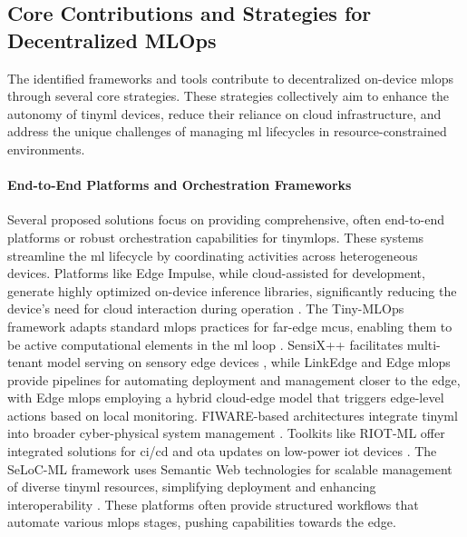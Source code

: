 \subsection{Core Contributions and Strategies for Decentralized MLOps}
\label{ssec:core_contributions_strategies_rq2}

The identified frameworks and tools contribute to decentralized on-device \gls{mlops} through several core strategies. These strategies collectively aim to enhance the autonomy of \gls{tinyml} devices, reduce their reliance on cloud infrastructure, and address the unique challenges of managing \gls{ml} lifecycles in resource-constrained environments.

\paragraph{End-to-End Platforms and Orchestration Frameworks}
Several proposed solutions focus on providing comprehensive, often end-to-end platforms or robust orchestration capabilities for \gls{tinymlops}. These systems streamline the \gls{ml} lifecycle by coordinating activities across heterogeneous devices. Platforms like Edge Impulse, while cloud-assisted for development, generate highly optimized on-device inference libraries, significantly reducing the device's need for cloud interaction during operation \cite{banburyEdgeImpulseMLOps2023}. The Tiny-MLOps framework adapts standard \gls{mlops} practices for far-edge \glspl{mcu}, enabling them to be active computational elements in the \gls{ml} loop \cite{antoniniTinyMLOpsFrameworkOrchestrating2022}. SensiX++ facilitates multi-tenant model serving on sensory edge devices \cite{minSensiXBringingMLOps2023}, while LinkEdge \cite{peltonenLinkEdgeOpensourcedMLOps2023} and Edge \gls{mlops} \cite{rajEdgeMLOpsAutomation2021} provide pipelines for automating deployment and management closer to the edge, with Edge \gls{mlops} employing a hybrid cloud-edge model that triggers edge-level actions based on local monitoring. FIWARE-based architectures integrate \gls{tinyml} into broader cyber-physical system management \cite{alselekAgileAIFirmware2024}. Toolkits like RIOT-ML offer integrated solutions for \gls{ci}/\gls{cd} and \gls{ota} updates on low-power \gls{iot} devices \cite{huangRIOTMLToolkitOvertheair2024a}. The SeLoC-ML framework uses Semantic Web technologies for scalable management of diverse \gls{tinyml} resources, simplifying deployment and enhancing interoperability \cite{renOndeviceOnlineLearning2024}. These platforms often provide structured workflows that automate various \gls{mlops} stages, pushing capabilities towards the edge.

